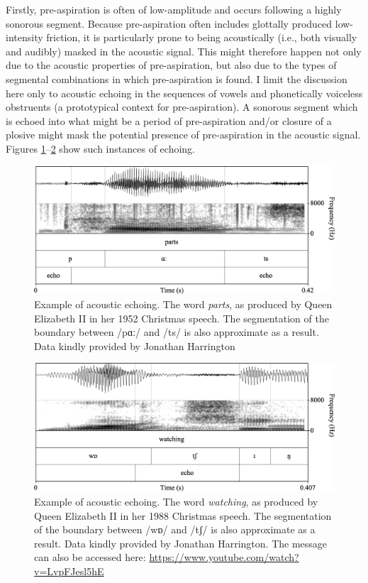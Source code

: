 \documentclass[output=paper]{langscibook}
\begin{document}
Firstly, pre\hyp aspiration is often of low-amplitude and occurs following a highly sonorous segment. Because pre\hyp aspiration often includes glottally produced low-intensity friction, it is particularly prone to being acoustically (i.e., both visually and audibly) masked in the acoustic signal. This might therefore happen not only due to the acoustic properties of pre-aspiration, but also due to the types of segmental combinations in which pre\hyp aspiration is found. I limit the discussion here only to acoustic echoing in the sequences of vowels and phonetically voiceless obstruents (a prototypical context for pre-aspiration). A sonorous segment which is echoed into what might be a period of pre\hyp aspiration and\slash or closure of a plosive might mask the potential presence of pre\hyp aspiration in the acoustic signal. Figures \ref{fig:hejna:5}--\ref{fig:hejna:6} show such instances of echoing.

  
\begin{figure}
\includegraphics[width=\textwidth]{figures/Hejna-img005.png}
\caption{\label{fig:hejna:5}Example of acoustic echoing. The word \textit{parts}, as produced by Queen Elizabeth II in her 1952 Christmas speech. The segmentation of the boundary between /pɑː/ and /ts/ is also approximate as a result. Data kindly provided by Jonathan Harrington}
\end{figure}
  
\begin{figure}
\includegraphics[width=\textwidth]{figures/Hejna-img006.png}
\caption{\label{fig:hejna:6}Example of acoustic echoing. The word \textit{watching}, as produced by Queen Elizabeth II in her 1988 Christmas speech. The segmentation of the boundary between /wɒ/ and /tʃ/ is also approximate as a result. Data kindly provided by Jonathan Harrington. The message can also be accessed here: \url{https://www.youtube.com/watch?v=LvpFJesl5hE}}
\end{figure}
\end{document}
